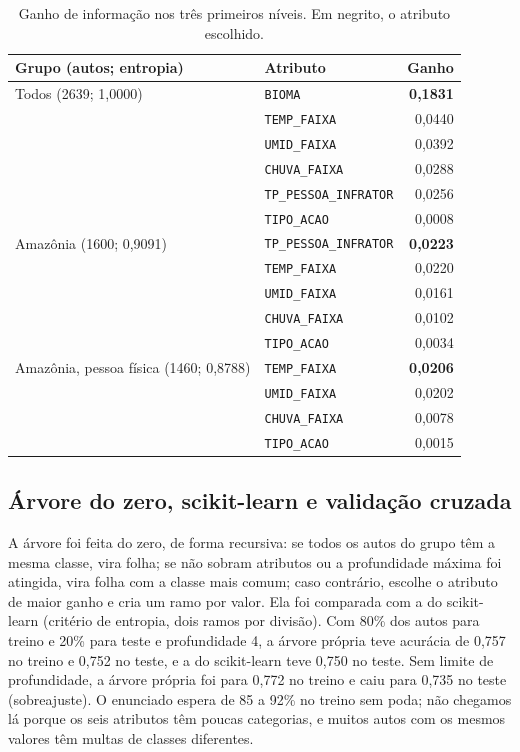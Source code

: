 \documentclass[11pt]{article}
\begin{document}
\begin{table}[H]
\centering
\begin{tabular}{llr}
\toprule
Grupo (autos; entropia) & Atributo & Ganho \\
\midrule
Todos (2639; 1,0000) & \texttt{BIOMA} & \textbf{0,1831} \\
 & \texttt{TEMP\_FAIXA} & 0,0440 \\
 & \texttt{UMID\_FAIXA} & 0,0392 \\
 & \texttt{CHUVA\_FAIXA} & 0,0288 \\
 & \texttt{TP\_PESSOA\_INFRATOR} & 0,0256 \\
 & \texttt{TIPO\_ACAO} & 0,0008 \\
\midrule
Amazônia (1600; 0,9091) & \texttt{TP\_PESSOA\_INFRATOR} & \textbf{0,0223} \\
 & \texttt{TEMP\_FAIXA} & 0,0220 \\
 & \texttt{UMID\_FAIXA} & 0,0161 \\
 & \texttt{CHUVA\_FAIXA} & 0,0102 \\
 & \texttt{TIPO\_ACAO} & 0,0034 \\
\midrule
Amazônia, pessoa física (1460; 0,8788) & \texttt{TEMP\_FAIXA} & \textbf{0,0206} \\
 & \texttt{UMID\_FAIXA} & 0,0202 \\
 & \texttt{CHUVA\_FAIXA} & 0,0078 \\
 & \texttt{TIPO\_ACAO} & 0,0015 \\
\bottomrule
\end{tabular}
\caption{Ganho de informação nos três primeiros níveis. Em negrito, o atributo escolhido.}
\label{tab:ganho}
\end{table}

\subsection{Árvore do zero, scikit-learn e validação cruzada}
A árvore foi feita do zero, de forma recursiva: se todos os autos do grupo têm a mesma classe, vira folha; se não sobram atributos ou a profundidade máxima foi atingida, vira folha com a classe mais comum; caso contrário, escolhe o atributo de maior ganho e cria um ramo por valor. Ela foi comparada com a do scikit-learn (critério de entropia, dois ramos por divisão). Com 80\% dos autos para treino e 20\% para teste e profundidade 4, a árvore própria teve acurácia de 0,757 no treino e 0,752 no teste, e a do scikit-learn teve 0,750 no teste. Sem limite de profundidade, a árvore própria foi para 0,772 no treino e caiu para 0,735 no teste (sobreajuste). O enunciado espera de 85 a 92\% no treino sem poda; não chegamos lá porque os seis atributos têm poucas categorias, e muitos autos com os mesmos valores têm multas de classes diferentes.
\end{document}
